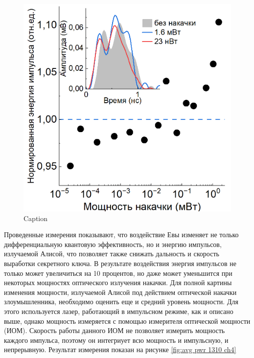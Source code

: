 \begin{figure}
    \centering
    \includegraphics[width=\textwidth]{images/1310_энергия.png}
    \caption{Caption}
    \label{fig:energy 1310 ch4}
\end{figure}
Проведенные измерения показывают, что воздействие Евы изменяет не только дифференциальную квантовую эффективность, но и энергию импульсов, излучаемой Алисой, что позволяет также снижать дальность и скорость выработки секретного ключа. В результате воздействия энергия импульсов не только может увеличиться на 10 процентов, но даже может уменьшится при некоторых мощностях оптического излучения накачки.
\newline Для полной картины изменения мощности, излучаемой Алисой под действием оптической накачки злоумышленника, необходимо оценить еще  и средний уровень мощности. Для этого используется лазер, работающий в импульсном режиме, как и описано выше, однако мощность измеряется с помощью измерителя оптической мощности (ИОМ). Скорость работы данного ИОМ не позволяет измерить мощность каждого импульса, поэтому он интегриует всю мощность и импульсную, и непрерывную. Результат измерения показан на рисунке \ref{fig:avg pwr 1310 ch4} 
